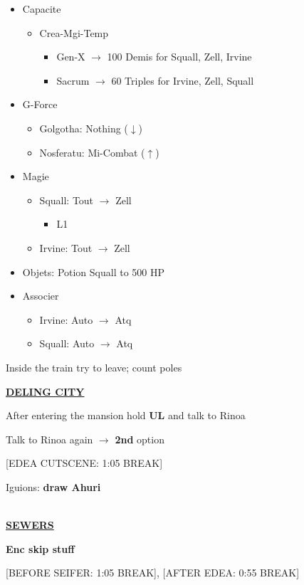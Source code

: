 \begin{menu}
	\begin{itemize}
		\item Capacite
			\begin{itemize}
				\item Crea-Mgi-Temp
					\begin{itemize}
						\item Gen-X $\rightarrow$ 100 Demis for Squall, Zell, Irvine
						\item Sacrum $\rightarrow$ 60 Triples for Irvine, Zell, Squall
					\end{itemize}
			\end{itemize}
		\item G-Force
			\begin{itemize}
				\item Golgotha: Nothing ($\downarrow$)
				\item Nosferatu: Mi-Combat ($\uparrow$)
			\end{itemize}
		\item Magie
			\begin{itemize}
				\item Squall: Tout $\rightarrow$ Zell
					\begin{itemize}
						\item L1
					\end{itemize}
				\item Irvine: Tout $\rightarrow$ Zell 
			\end{itemize}
		\item Objets: Potion Squall to 500 HP
		\item Associer
			\begin{itemize}
				\item Irvine: Auto $\rightarrow$ Atq
				\item Squall: Auto $\rightarrow$ Atq
			\end{itemize}
	\end{itemize}
\end{menu}

Inside the train try to leave; count poles

\newpage
\underline{\textbf{DELING CITY}}

After entering the mansion hold \textbf{UL} and talk to Rinoa

Talk to Rinoa again $\rightarrow$ \textbf{2nd} option

[EDEA CUTSCENE: 1:05 BREAK]

Iguions: \textbf{draw Ahuri}

\leavevmode\\
\underline{\textbf{SEWERS}}

\textbf{Enc skip stuff}

[BEFORE SEIFER: 1:05 BREAK], [AFTER EDEA: 0:55 BREAK]


